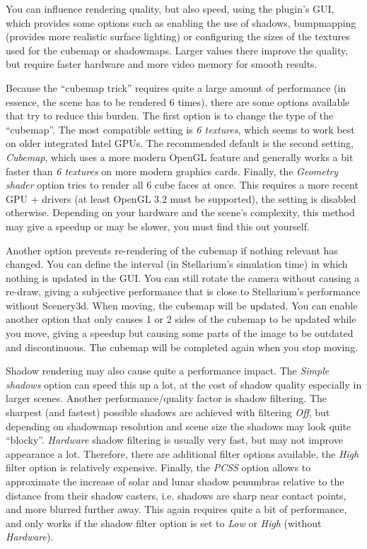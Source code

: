 You can influence rendering quality, but also speed, using the plugin's 
GUI, which provides some options such as enabling the use
of shadows, bumpmapping (provides more realistic surface lighting) or 
configuring the sizes of the textures used
for the cubemap or shadowmaps. Larger values there improve the quality,
but require faster hardware and more video memory for smooth results.

Because the ``cubemap trick'' requires quite a large amount of performance (in
essence, the scene has to be rendered 6 times), there are some options available
that try to reduce this burden. The first option is to change the type of the
``cubemap''. The most compatible setting is \emph{6 textures}, which seems to
work best on older integrated Intel GPUs. The recommended default is the second
setting, \emph{Cubemap}, which uses a more modern OpenGL feature and generally
works a bit faster than \emph{6 textures} on more modern graphics cards. Finally,
the \emph{Geometry shader} option tries to render all 6 cube faces at once. This
requires a more recent GPU + drivers (at least OpenGL 3.2 must be supported),
the setting is disabled otherwise. Depending on your hardware and the scene's
complexity, this method may give a speedup or may be slower, you must find this out yourself.

Another option prevents re-rendering of the cubemap if nothing relevant has
changed. You can define the interval (in Stellarium's simulation time) in which
nothing is updated in the GUI. You can still rotate the camera without causing a
re-draw, giving a subjective performance that is close to Stellarium's
performance without Scenery3d. When moving, the cubemap will be updated. You can
enable another option that only causes 1 or 2 sides of the cubemap to be updated
while you move, giving a speedup but causing some parts of the image to be
outdated and discontinuous. The cubemap will be completed again when you stop
moving.

Shadow rendering may also cause quite a performance impact. The \emph{Simple
shadows} option can speed this up a lot, at the cost of shadow quality
especially in larger scenes. Another performance/quality factor is shadow
filtering. The sharpest (and fastest) possible shadows are achieved with
filtering \emph{Off}, but depending on shadowmap resolution and scene size the
shadows may look quite ``blocky''. \emph{Hardware} shadow filtering is usually
very fast, but may not improve appearance a lot. Therefore, there are additional
filter options available, the \emph{High} filter option is relatively expensive.
Finally, the \emph{PCSS} option allows to approximate the increase of solar and lunar shadow
penumbras relative to the distance from their shadow casters, i.e. shadows are
sharp near contact points, and more blurred further away. This again requires
quite a bit of performance, and only works if the shadow filter option is set to
\emph{Low} or \emph{High} (without \emph{Hardware}).

